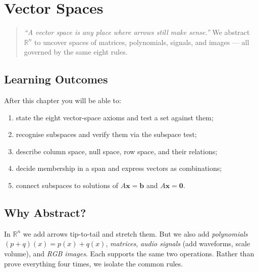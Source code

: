 \chapter{Vector Spaces}
\label{ch:vectorspaces}

\begin{quote}
\emph{``A vector space is any place where arrows still make sense.''} We abstract $\mathbb{R}^n$ to uncover spaces of matrices, polynomials, signals, and images --- all governed by the same eight rules.
\end{quote}

\noindent{}
\vspace{0.4em}

\section*{Learning Outcomes}
After this chapter you will be able to:
\begin{enumerate}[label=(L\arabic*)]
    \item state the eight vector-space axioms and test a set against them;
    \item recognise subspaces and verify them via the subspace test;
    \item describe column space, null space, row space, and their relations;
    \item decide membership in a span and express vectors as combinations;
    \item connect subspaces to solutions of $A\mathbf{x}=\mathbf{b}$ and $A\mathbf{x}=\mathbf{0}$.
\end{enumerate}

\section{Why Abstract?}
\label{sec:why-abstract}
In $\mathbb{R}^n$ we add arrows tip-to-tail and stretch them. But we also add \emph{polynomials} $(p+q)(x)=p(x)+q(x)$, \emph{matrices}, \emph{audio signals} (add waveforms, scale volume), and \emph{RGB images}. Each supports the same two operations. Rather than prove everything four times, we isolate the common rules.

